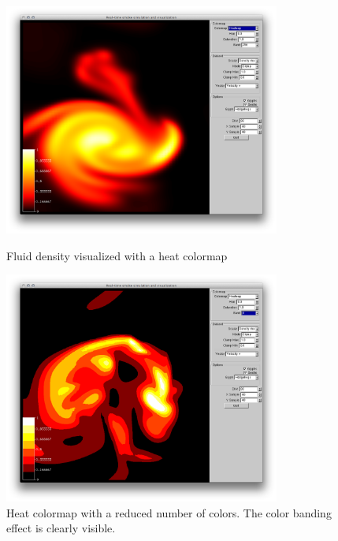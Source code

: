 \begin{figure}[htbp]
\centering
\begin{minipage}[t]{0.48\textwidth}
        \includegraphics[height=3in]{figures/colormaps/heatmapSmoke.png}
\caption{Fluid density visualized with a heat colormap}
\label{fig:revised:modelingLanguages}
\end{minipage}\hspace{.04\textwidth}%
\begin{minipage}[t]{0.48\textwidth}
        \includegraphics[height=3in]{figures/colormaps/heatmapSmokeBanded.png}
    \caption{Heat colormap with a reduced number of colors. The color banding effect is clearly visible.}
    \label{fig:revised:reqFormat}
\end{minipage}
\end{figure}

